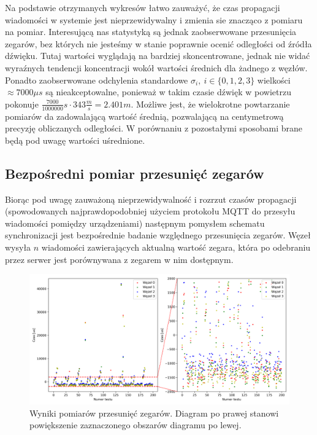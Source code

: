 Na podstawie otrzymanych wykresów łatwo zauważyć, że czas propagacji wiadomości w systemie jest nieprzewidywalny i zmienia sie znacząco z pomiaru na pomiar. Interesującą nas statystyką są jednak zaobserwowane przesunięcia zegarów, bez których nie jesteśmy w stanie poprawnie ocenić odległości od źródła dźwięku. Tutaj wartości wyglądają na bardziej skoncentrowane, jednak nie widać wyraźnych tendencji koncentracji wokół wartości średnich dla żadnego z węzłów. Ponadto zaobserwowane odchylenia standardowe $\sigma_i,\ i \in \{0,1,2,3\}$ wielkości $\approx 7000 \mu s$ są nieakceptowalne, ponieważ w takim czasie dźwięk w powietrzu pokonuje $\frac{7000}{1000000}s \cdot 343\frac{m}{s} = 2.401m$. Możliwe jest, że wielokrotne powtarzanie pomiarów da zadowalającą wartość średnią, pozwalającą na centymetrową precyzję obliczanych odległości. W porównaniu z pozostałymi sposobami brane będą pod uwagę wartości uśrednione.

\subsection{Bezpośredni pomiar przesunięć zegarów}\label{sec:time_deltas_sync}

Biorąc pod uwagę zauważoną nieprzewidywalność i rozrzut czasów propagacji (spowodowanych najprawdopodobniej użyciem protokołu MQTT do przesyłu wiadomości pomiędzy urządzeniami) następnym pomysłem schematu synchronizacji jest bezpośrednie badanie względnego przesunięcia zegarów. Węzeł wysyła $n$ wiadomości zawierających aktualną wartość zegara, która po odebraniu przez serwer jest porównywana z zegarem w nim dostępnym.

\begin{figure}[H]
    \centering
    \includegraphics[width=\textwidth]{pics/time_deltas/time_deltas.png}
    \caption{Wyniki pomiarów przesunięć zegarów.   Diagram po prawej stanowi powiększenie zaznaczonego obszarów diagramu po lewej.}
    \label{pic:offsets_deltas}
\end{figure}

